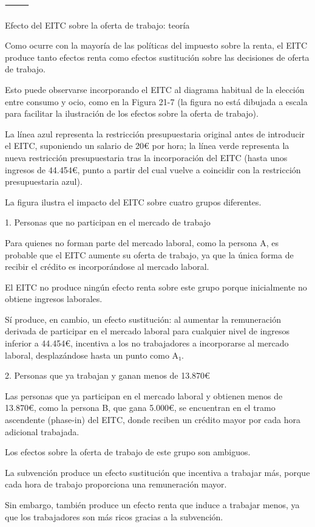 \documentclass[10pt,a4paper]{article}
\begin{document}
⸻

Efecto del EITC sobre la oferta de trabajo: teoría

Como ocurre con la mayoría de las políticas del impuesto sobre la renta, el EITC produce tanto efectos renta como efectos sustitución sobre las decisiones de oferta de trabajo.

Esto puede observarse incorporando el EITC al diagrama habitual de la elección entre consumo y ocio, como en la Figura 21-7 (la figura no está dibujada a escala para facilitar la ilustración de los efectos sobre la oferta de trabajo).

La línea azul representa la restricción presupuestaria original antes de introducir el EITC, suponiendo un salario de 20€ por hora; la línea verde representa la nueva restricción presupuestaria tras la incorporación del EITC (hasta unos ingresos de 44.454€, punto a partir del cual vuelve a coincidir con la restricción presupuestaria azul).

La figura ilustra el impacto del EITC sobre cuatro grupos diferentes.

1. Personas que no participan en el mercado de trabajo

Para quienes no forman parte del mercado laboral, como la persona A, es probable que el EITC aumente su oferta de trabajo, ya que la única forma de recibir el crédito es incorporándose al mercado laboral.

El EITC no produce ningún efecto renta sobre este grupo porque inicialmente no obtiene ingresos laborales.

Sí produce, en cambio, un efecto sustitución: al aumentar la remuneración derivada de participar en el mercado laboral para cualquier nivel de ingresos inferior a 44.454€, incentiva a los no trabajadores a incorporarse al mercado laboral, desplazándose hasta un punto como A₁.

2. Personas que ya trabajan y ganan menos de 13.870€

Las personas que ya participan en el mercado laboral y obtienen menos de 13.870€, como la persona B, que gana 5.000€, se encuentran en el tramo ascendente (phase-in) del EITC, donde reciben un crédito mayor por cada hora adicional trabajada.

Los efectos sobre la oferta de trabajo de este grupo son ambiguos.

La subvención produce un efecto sustitución que incentiva a trabajar más, porque cada hora de trabajo proporciona una remuneración mayor.

Sin embargo, también produce un efecto renta que induce a trabajar menos, ya que los trabajadores son más ricos gracias a la subvención.
\end{document}
